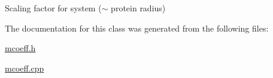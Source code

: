 Scaling factor for system ($\sim$ protein radius) 



The documentation for this class was generated from the following files\-:\begin{DoxyCompactItemize}
\item 
\hyperlink{mcoeff_8h}{mcoeff.\-h}\item 
\hyperlink{mcoeff_8cpp}{mcoeff.\-cpp}\end{DoxyCompactItemize}
